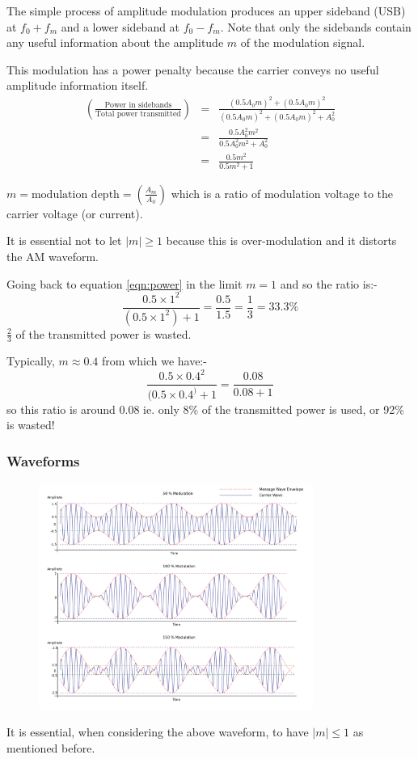 \documentclass[11pt]{article} %
\begin{document}
		The simple process of amplitude modulation produces an upper sideband (USB) at $f_0+f_m$ and a lower sideband at $f_0-f_m$. Note that only the sidebands contain any useful information about the amplitude $m$ of the modulation signal.

		This modulation has a power penalty because the carrier conveys no useful amplitude information itself.
		\begin{eqnarray}
			\left(\frac{\mbox{Power in sidebands}}{\mbox{Total power transmitted}}\right) &=& \frac{(0.5A_0m)^2+(0.5A_0m)^2}{(0.5A_0m)^2+(0.5A_0m)^2+A_0^2} \nonumber \\
			&=& \frac{0.5A_0^2m^2}{0.5A_0^2m^2 + A_0^2} \nonumber \\
			&=& \frac{0.5m^2}{0.5m^2+1}
			\label{eqn:power}
		\end{eqnarray}

		$m = \mbox{modulation depth} = \left(\frac{A_m}{A_0}\right)$ which is a ratio of modulation voltage to the carrier voltage (or current).

		It is essential not to let $|m|\ge 1$ because this is over-modulation and it distorts the AM waveform.

		Going back to equation \ref{eqn:power}  in the limit $m=1$ and so the ratio is:-
		\begin{equation}
			\frac{0.5\times 1^2}{(0.5\times 1^2)+1} = \frac{0.5}{1.5} = \frac{1}{3} = 33.3\%
		\end{equation}
		$\frac{2}{3}$ of the transmitted power is wasted.

		Typically, $m\approx 0.4$ from which we have:-
		\begin{equation}
			\frac{0.5\times 0.4^2}{(0.5\times 0.4^)+1} = \frac{0.08}{0.08+1}
		\end{equation}
		so this ratio is around 0.08 ie. only 8\% of the transmitted power is used, or 92\% is wasted!

	\subsubsection{Waveforms}
		\begin{figure}[h]
			\centering
			\includegraphics[width=0.8\textwidth]{modulatedwave}
		\end{figure}
		It is essential, when considering the above waveform, to have $|m|\le 1$ as mentioned before.
\end{document}
